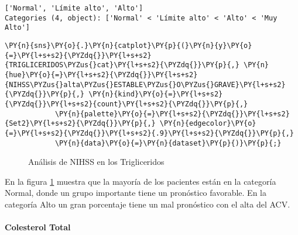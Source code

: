             \begin{tcolorbox}[breakable, size=fbox, boxrule=.5pt, pad at break*=1mm, opacityfill=0]
\begin{Verbatim}[commandchars=\\\{\}]
['Normal', 'Límite alto', 'Alto']
Categories (4, object): ['Normal' < 'Límite alto' < 'Alto' < 'Muy Alto']
\end{Verbatim}
\end{tcolorbox}
        
    \begin{tcolorbox}[breakable, size=fbox, boxrule=1pt, pad at break*=1mm,colback=cellbackground, colframe=cellborder]
\begin{Verbatim}[commandchars=\\\{\}]
\PY{n}{sns}\PY{o}{.}\PY{n}{catplot}\PY{p}{(}\PY{n}{y}\PY{o}{=}\PY{l+s+s2}{\PYZdq{}}\PY{l+s+s2}{TRIGLICERIDOS\PYZus{}cat}\PY{l+s+s2}{\PYZdq{}}\PY{p}{,} \PY{n}{hue}\PY{o}{=}\PY{l+s+s2}{\PYZdq{}}\PY{l+s+s2}{NIHSS\PYZus{}alta\PYZus{}ESTABLE\PYZus{}O\PYZus{}GRAVE}\PY{l+s+s2}{\PYZdq{}}\PY{p}{,} \PY{n}{kind}\PY{o}{=}\PY{l+s+s2}{\PYZdq{}}\PY{l+s+s2}{count}\PY{l+s+s2}{\PYZdq{}}\PY{p}{,}
            \PY{n}{palette}\PY{o}{=}\PY{l+s+s2}{\PYZdq{}}\PY{l+s+s2}{Set2}\PY{l+s+s2}{\PYZdq{}}\PY{p}{,} \PY{n}{edgecolor}\PY{o}{=}\PY{l+s+s2}{\PYZdq{}}\PY{l+s+s2}{.9}\PY{l+s+s2}{\PYZdq{}}\PY{p}{,}
            \PY{n}{data}\PY{o}{=}\PY{n}{dataset}\PY{p}{)}\PY{p}{;}
\end{Verbatim}
\end{tcolorbox}

\begin{center}
    	\begin{figure}[H]
	\centering
	\caption{Análisis de NIHSS en los Trigliceridos}
	\label{fig:aNISStri}
	\end{figure}
\end{center}
    
    En la figura \ref{fig:aNISStri} muestra que la mayoría de los pacientes están en la categoría Normal, donde un grupo importante tiene un pronóstico favorable. En la categoría Alto un gran porcentaje tiene un mal pronóstico con el alta del ACV.

    \hypertarget{colesterol-total}{%
\paragraph{Colesterol Total}\label{colesterol-total}}


